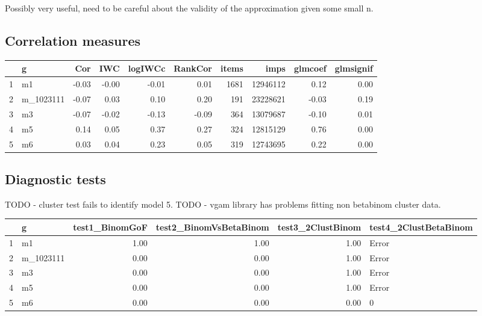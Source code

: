 \documentclass[11pt,a4,singlespacing,titlepagenumber=on]{scrreprt}
\numberwithin{equation}{chapter} %
\theoremstyle{remark}
\begin{document}
Possibly very useful, need to be careful about the validity of the approximation given some small n.

\subsection{Correlation measures}

\begin{table}[ht]
\centering
\begin{tabular}{rlrrrrrrrr}
  \hline
 & g & Cor & IWC & logIWCc & RankCor & items & imps & glmcoef & glmsignif \\ 
  \hline
1 & m1 & -0.03 & -0.00 & -0.01 & 0.01 & 1681 & 12946112 & 0.12 & 0.00 \\ 
  2 & m\_1023111 & -0.07 & 0.03 & 0.10 & 0.20 & 191 & 23228621 & -0.03 & 0.19 \\ 
  3 & m3 & -0.07 & -0.02 & -0.13 & -0.09 & 364 & 13079687 & -0.10 & 0.01 \\ 
  4 & m5 & 0.14 & 0.05 & 0.37 & 0.27 & 324 & 12815129 & 0.76 & 0.00 \\ 
  5 & m6 & 0.03 & 0.04 & 0.23 & 0.05 & 319 & 12743695 & 0.22 & 0.00 \\ 
   \hline
\end{tabular}
\end{table}


\subsection{Diagnostic tests}

TODO - cluster test fails to identify model 5.
TODO - vgam library has problems fitting non betabinom cluster data.
\begin{table}[ht]
\centering
\begin{tabular}{rlrrrl}
  \hline
 & g & test1\_BinomGoF & test2\_BinomVsBetaBinom & test3\_2ClustBinom & test4\_2ClustBetaBinom \\ 
  \hline
1 & m1 & 1.00 & 1.00 & 1.00 & Error \\ 
  2 & m\_1023111 & 0.00 & 0.00 & 1.00 & Error \\ 
  3 & m3 & 0.00 & 0.00 & 1.00 & Error \\ 
  4 & m5 & 0.00 & 0.00 & 1.00 & Error \\ 
  5 & m6 & 0.00 & 0.00 & 0.00 & 0 \\ 
   \hline
\end{tabular}
\end{table}
\end{document}
